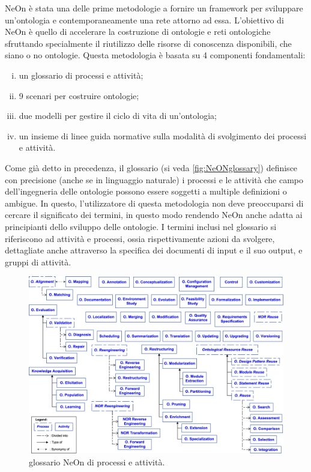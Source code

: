 NeOn \cite{NeOn} è stata una delle prime metodologie a fornire un framework per sviluppare un'ontologia e contemporaneamente una rete attorno ad essa. L'obiettivo di NeOn è quello di accelerare la costruzione di ontologie e reti ontologiche sfruttando specialmente il riutilizzo delle risorse di conoscenza disponibili, che siano o no ontologie. Questa metodologia è basata su 4 componenti fondamentali:
\begin{enumerate}[i.]
	\item un glossario di processi e attività;
	\label{itm:glossario}
	\item 9 scenari per costruire ontologie;
	\label{itm:scenari}
	\item due modelli per gestire il ciclo di vita di un'ontologia;
	\item un insieme di linee guida normative sulla modalità di svolgimento dei processi e attività.
\end{enumerate}
Come già detto in precedenza, il glossario (si veda \autoref{fig:NeONglossary}) definisce con precisione (anche se in linguaggio naturale) i processi e le attività che campo dell'ingegneria delle ontologie possono essere soggetti a multiple definizioni o ambigue. In questo, l'utilizzatore di questa metodologia non deve preoccuparsi di cercare il significato dei termini, in questo modo rendendo NeOn anche adatta ai principianti dello sviluppo delle ontologie. I termini inclusi nel glossario si riferiscono ad attività e processi, ossia rispettivamente azioni da svolgere, dettagliate anche attraverso la specifica dei documenti di input e il suo output, e gruppi di attività. 

\begin{figure}
	\centering
	\includegraphics[scale=0.8]{pictures/NeOn-Glossary.jpg}
	\caption{glossario NeOn \cite{NeOn} di processi e attività.}
	\label{fig:NeONglossary}
\end{figure}

